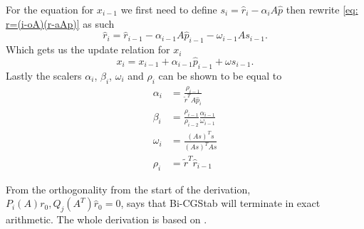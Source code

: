 \noindent For the equation for \(x_{i-1}\) we first need to define \(s_i=\hat{r}_i-\alpha_i A \hat{p}\) then rewrite \eqref{eq: r=(i-oA)(r-aAp)} as such
\begin{equation}
    \hat{r}_i=\hat{r}_{i-1}-\alpha_{i-1}A\hat{p}_{i-1}-\omega_{i-1}As_{i-1}.
\end{equation}
Which gets us the update relation for \(x_i\)
\begin{equation}
    x_i=x_{i-1}+\alpha_{i-1}\hat{p}_{i-1}+\omega s_{i-1}.
\end{equation}
Lastly the scalers \(\alpha_i\), \(\beta_i\), \(\omega_i\) and \(\rho_i\) can be shown to be equal to 
\begin{align}
    \alpha_i&=\frac{\rho_{i-1}}{\tilde{r}^TA\hat{p}_i}\\
    \beta_i&=\frac{\rho_{i-1}}{\rho_{i-2}}\frac{\alpha_{i-1}}{\omega_{i-1}}\\
    \omega_i&=\frac{(As)^Ts}{(As)^TAs}\\
    \rho_i&=\tilde{r}^T\hat{r}_{i-1}
\end{align}

From the orthogonality from the start of the derivation, \(P_i(A)r_0,Q_j(A^T)\hat{r}_0=0\), says that Bi-CGStab will terminate in exact arithmetic. The whole derivation is based on \cite{Vorst03}.